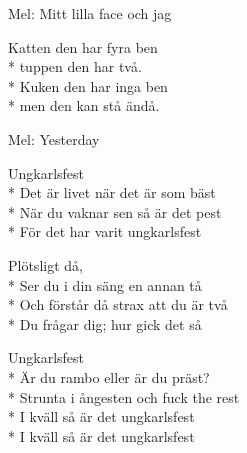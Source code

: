 \begin{SongText}[Benvisa]
    \begin{SongInfo}
        Mel: Mitt lilla face och jag
    \end{SongInfo}
    \begin{SongVerse}
        Katten den har fyra ben\\*%
        tuppen den har två.\\*%
        Kuken den har inga ben\\*%
        men den kan stå ändå.
    \end{SongVerse}
\end{SongText}
\begin{SongText}[Ungkarlsfest]
    \begin{SongInfo}
        Mel: Yesterday
    \end{SongInfo}
    \begin{SongVerse}
        Ungkarlsfest\\*%
        Det är livet när det är som bäst\\*%
        När du vaknar sen så är det pest\\*%
        För det har varit ungkarlsfest
    \end{SongVerse}
    \begin{SongVerse}
        Plötsligt då,\\*%
        Ser du i din säng en annan tå\\*%
        Och förstår då strax att du är två\\*%
        Du frågar dig; hur gick det så
    \end{SongVerse}
    \begin{SongVerse}
        Ungkarlsfest\\*%
        Är du rambo eller är du präst?\\*%
        Strunta i ångesten och fuck the rest\\*%
        I kväll så är det ungkarlsfest\\*%
        I kväll så är det ungkarlsfest
    \end{SongVerse}
\end{SongText}
